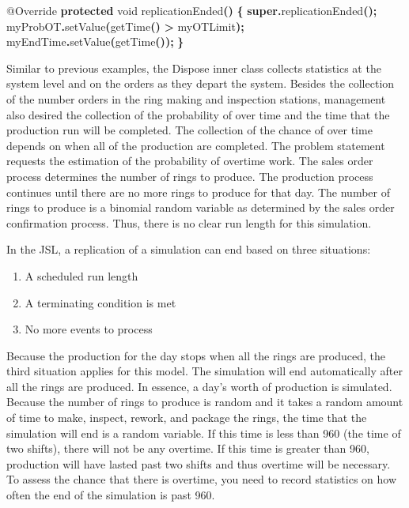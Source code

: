 \documentclass[
]{book}
\newenvironment{Shaded}{\begin{snugshade}}{\end{snugshade}}
\newcommand{\AttributeTok}[1]{\textcolor[rgb]{0.77,0.63,0.00}{#1}}
\newcommand{\DataTypeTok}[1]{\textcolor[rgb]{0.13,0.29,0.53}{#1}}
\newcommand{\FunctionTok}[1]{\textcolor[rgb]{0.00,0.00,0.00}{#1}}
\newcommand{\KeywordTok}[1]{\textcolor[rgb]{0.13,0.29,0.53}{\textbf{#1}}}
\newcommand{\NormalTok}[1]{#1}
\newcommand{\OperatorTok}[1]{\textcolor[rgb]{0.81,0.36,0.00}{\textbf{#1}}}
\theoremstyle{definition}
\theoremstyle{definition}
\theoremstyle{definition}
\theoremstyle{definition}
\theoremstyle{remark}
\begin{document}
\begin{Shaded}
\begin{Highlighting}[]
\AttributeTok{@Override}
\KeywordTok{protected} \DataTypeTok{void} \FunctionTok{replicationEnded}\OperatorTok{()} \OperatorTok{\{}
    \KeywordTok{super}\OperatorTok{.}\FunctionTok{replicationEnded}\OperatorTok{();}
\NormalTok{    myProbOT}\OperatorTok{.}\FunctionTok{setValue}\OperatorTok{(}\FunctionTok{getTime}\OperatorTok{()} \OperatorTok{\textgreater{}}\NormalTok{ myOTLimit}\OperatorTok{);}
\NormalTok{    myEndTime}\OperatorTok{.}\FunctionTok{setValue}\OperatorTok{(}\FunctionTok{getTime}\OperatorTok{());}
\OperatorTok{\}}
\end{Highlighting}
\end{Shaded}

Similar to previous examples, the Dispose inner class collects
statistics at the system level and on the orders as they depart the
system. Besides the collection of the number orders in the ring making
and inspection stations, management also desired the collection of the
probability of over time and the time that the production run will be
completed. The collection of the chance of over time depends on when all
of the production are completed. The problem statement requests the
estimation of the probability of overtime work. The sales order process
determines the number of rings to produce. The production process
continues until there are no more rings to produce for that day. The
number of rings to produce is a binomial random variable as determined
by the sales order confirmation process. Thus, there is no clear run
length for this simulation.

In the JSL, a replication of a simulation can end based on three
situations:

\begin{enumerate}
\def\labelenumi{\arabic{enumi}.}
\item
  A scheduled run length
\item
  A terminating condition is met
\item
  No more events to process
\end{enumerate}

Because the production for the day stops when all the rings are
produced, the third situation applies for this model. The simulation
will end automatically after all the rings are produced. In essence, a
day's worth of production is simulated. Because the number of rings to
produce is random and it takes a random amount of time to make, inspect,
rework, and package the rings, the time that the simulation will end is
a random variable. If this time is less than 960 (the time of two
shifts), there will not be any overtime. If this time is greater than
960, production will have lasted past two shifts and thus overtime will
be necessary. To assess the chance that there is overtime, you need to
record statistics on how often the end of the simulation is past 960.
\end{document}
